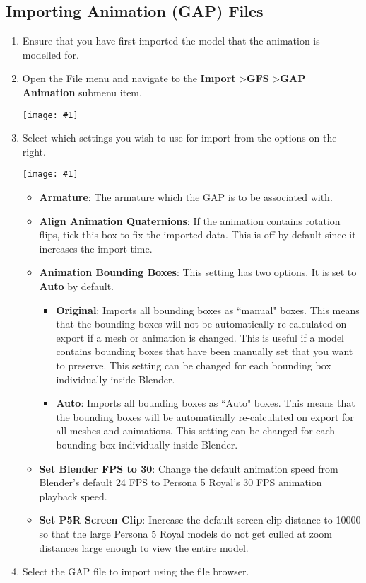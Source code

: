 \documentclass{article}
\newenvironment{guide}[1]
{
	\begin{center}
		\begin{tcolorbox}[%
			colback=black!20, 
			boxrule=0pt, 
			title=Step-by-step: #1,
			enhanced,
			breakable,
			overlay unbroken={%
                \draw[line width=1pt, black, rounded corners]
        	    (frame.north west) rectangle (frame.south east);
			},
    		overlay first={%
        		 \draw[line width=1pt, black, rounded corners]
        	    (frame.south west) -- (frame.north west) -- (frame.north east) -- (frame.south east);
                \draw[line width=1pt, black]
                (frame.south west) -- (frame.south east);
            },
    		overlay middle={%
                \draw[line width=1pt, black]
        	    (frame.north west) rectangle (frame.south east);
        	},
    		overlay last={%
                \draw[line width=1pt, black, rounded corners]
        	    (frame.north west) -- (frame.south west) -- (frame.south east) -- (frame.north east);
                \draw[line width=1pt, black]
                (frame.north west) -- (frame.north east);
           	}
        ]{}
    	\begin{enumerate}
}
{
    		\end{enumerate}
    	\end{tcolorbox}
	\end{center}  	 
}
\newcommand{\guideimage}[1]
{
	\begin{center}
		\texttt{[image: \#1]}
	\end{center}
}
\begin{document}
\subsection{Importing Animation (GAP) Files}
\begin{guide}{Accessing the Animation Import Menu}
\item Ensure that you have first imported the model that the animation is modelled for.
\item Open the File menu and navigate to the \textbf{Import} \textgreater\space \textbf{GFS} \textgreater\space \textbf{GAP Animation} submenu item.
\guideimage{images/import/import_gap.png}
\item Select which settings you wish to use for import from the options on the right.
\guideimage{images/import/import_gap_properties.png}
\begin{itemize}
\item \textbf{Armature}: The armature which the GAP is to be associated with.
\item \textbf{Align Animation Quaternions}: If the animation contains rotation flips, tick this box to fix the imported data. This is off by default since it increases the import time.
\item \textbf{Animation Bounding Boxes}: This setting has two options. It is set to \textbf{Auto} by default.
\begin{itemize}
\item \textbf{Original}: Imports all bounding boxes as ``manual" boxes. This means that the bounding boxes will not be automatically re-calculated on export if a mesh or animation is changed. This is useful if a model contains bounding boxes that have been manually set that you want to preserve. This setting can be changed for each bounding box individually inside Blender.
\item \textbf{Auto}: Imports all bounding boxes as ``Auto" boxes. This means that the bounding boxes will be automatically re-calculated on export for all meshes and animations. This setting can be changed for each bounding box individually inside Blender.
\end{itemize}
\item \textbf{Set Blender FPS to 30}: Change the default animation speed from Blender's default 24 FPS to Persona 5 Royal's 30 FPS animation playback speed.
\item \textbf{Set P5R Screen Clip}: Increase the default screen clip distance to 10000 so that the large Persona 5 Royal models do not get culled at zoom distances large enough to view the entire model.
\end{itemize}
\item Select the GAP file to import using the file browser.
\end{guide}
\end{document}
